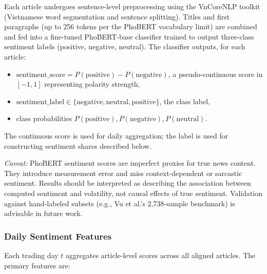 Each article undergoes sentence-level preprocessing using the VnCoreNLP toolkit (Vietnamese word segmentation and sentence splitting). Titles and first paragraphs (up to 256 tokens per the PhoBERT vocabulary limit) are combined and fed into a fine-tuned PhoBERT-base classifier trained to output three-class sentiment labels (positive, negative, neutral). The classifier outputs, for each article:
\begin{itemize}
    \item $\text{sentiment\_score} = P(\text{positive}) - P(\text{negative})$, a pseudo-continuous score in $[-1, 1]$ representing polarity strength,
    \item $\text{sentiment\_label} \in \{\text{negative}, \text{neutral}, \text{positive}\}$, the class label,
    \item class probabilities $P(\text{positive}), P(\text{negative}), P(\text{neutral})$.
\end{itemize}

The continuous score is used for daily aggregation; the label is used for constructing sentiment shares described below.

\textit{Caveat:} PhoBERT sentiment scores are imperfect proxies for true news content. They introduce measurement error and miss context-dependent or sarcastic sentiment. Results should be interpreted as describing the association between computed sentiment and volatility, not causal effects of true sentiment. Validation against hand-labeled subsets (e.g., Vu et al.'s 2,738-sample benchmark) is advisable in future work.

\subsubsection{Daily Sentiment Features}

Each trading day $t$ aggregates article-level scores across all aligned articles. The primary features are:

